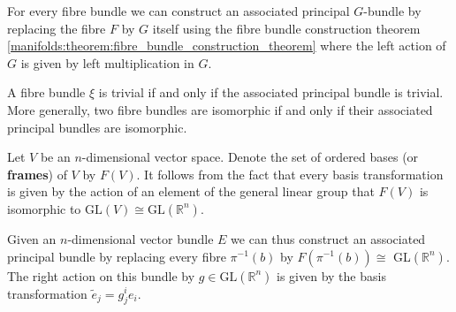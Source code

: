     \begin{construct}
        For every fibre bundle we can construct an associated principal $G$-bundle by replacing the fibre $F$ by $G$ itself using the fibre bundle construction theorem \ref{manifolds:theorem:fibre_bundle_construction_theorem} where the left action of $G$ is given by left multiplication in $G$.
    \end{construct}

    \begin{property}
        A fibre bundle $\xi$ is trivial if and only if the associated principal bundle is trivial. More generally, two fibre bundles are isomorphic if and only if their associated principal bundles are isomorphic.
    \end{property}

    \begin{example}\label{bundles:frame_bundle}
        Let $V$ be an $n$-dimensional vector space. Denote the set of ordered bases (or \textbf{frames}) of $V$ by $F(V)$. It follows from the fact that every basis transformation is given by the action of an element of the general linear group that $F(V)$ is isomorphic to $\text{GL}(V)\cong\text{GL}(\mathbb{R}^n)$.

        Given an $n$-dimensional vector bundle $E$ we can thus construct an associated principal bundle by replacing every fibre $\pi^{-1}(b)$ by $F(\pi^{-1}(b))\cong$ GL$(\mathbb{R}^n)$. The right action on this bundle by $g\in\text{GL}(\mathbb{R}^n)$ is given by the basis transformation $\widetilde{e}_j = g^i_je_i$.
    \end{example}

